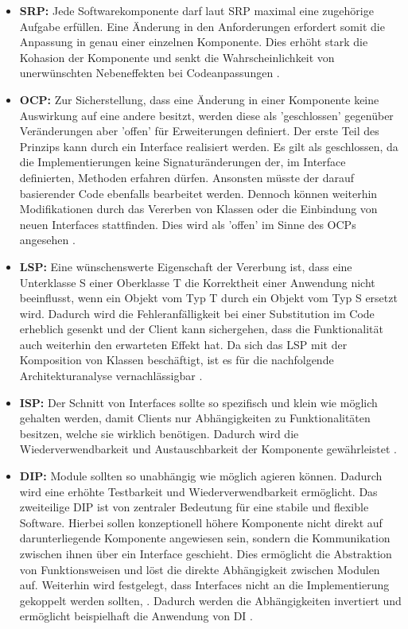 \begin{itemize}[]
	\item \textbf{\acrlong{SRP}: } {Jede Softwarekomponente darf laut SRP maximal eine zugehörige Aufgabe erfüllen. Eine Änderung in den Anforderungen erfordert somit die Anpassung in genau einer einzelnen Komponente. Dies erhöht stark die \Gls{Kohasion} der Komponente und senkt die Wahrscheinlichkeit von unerwünschten Nebeneffekten bei Codeanpassungen \cite{Martin.SRP, Martin.2018}.}
	\item \textbf{\acrlong{OCP}: } {Zur Sicherstellung, dass eine Änderung in einer Komponente keine Auswirkung auf eine andere besitzt, werden diese als 'geschlossen' gegenüber Veränderungen aber 'offen' für Erweiterungen definiert. Der erste Teil des Prinzips kann durch ein Interface realisiert werden. Es gilt als geschlossen, da die Implementierungen keine Signaturänderungen der, im Interface definierten, Methoden erfahren dürfen. Ansonsten müsste der darauf basierender Code ebenfalls bearbeitet werden. Dennoch können weiterhin Modifikationen durch das Vererben von Klassen oder die Einbindung von neuen Interfaces stattfinden. Dies wird als 'offen' im Sinne des OCPs angesehen \cite{Martin.2018, Meyer.2009}.}
	\item \textbf{\acrlong{LSP}: } {Eine wünschenswerte Eigenschaft der Vererbung ist, dass eine Unterklasse S einer Oberklasse T die Korrektheit einer Anwendung nicht beeinflusst, wenn ein Objekt vom Typ T durch ein Objekt vom Typ S ersetzt wird. Dadurch wird die Fehleranfälligkeit bei einer Substitution im Code erheblich gesenkt und der Client kann sichergehen, dass die Funktionalität auch weiterhin den erwarteten Effekt hat. Da sich das LSP mit der Komposition von Klassen beschäftigt, ist es für die nachfolgende Architekturanalyse vernachlässigbar \cite{Martin.2018, Liskov.1994}.}
	\item \textbf{\acrlong{ISP}: } {Der Schnitt von Interfaces sollte so spezifisch und klein wie möglich gehalten werden, damit Clients nur Abhängigkeiten zu Funktionalitäten besitzen, welche sie wirklich benötigen. Dadurch wird die Wiederverwendbarkeit und Austauschbarkeit der Komponente gewährleistet \cite{Martin.2018}\cite[S. 135ff.]{Martin.2003}.}
	\item \textbf{\acrlong{DIP}: } {Module sollten so unabhängig wie möglich agieren können. Dadurch wird eine erhöhte Testbarkeit und Wiederverwendbarkeit ermöglicht. Das zweiteilige DIP ist von zentraler Bedeutung für eine stabile und flexible Software. Hierbei sollen konzeptionell höhere Komponente nicht direkt auf darunterliegende Komponente angewiesen sein, sondern die Kommunikation zwischen ihnen über ein Interface geschieht. Dies ermöglicht die Abstraktion von Funktionsweisen und löst die direkte Abhängigkeit zwischen Modulen auf. Weiterhin wird festgelegt, dass Interfaces nicht an die Implementierung gekoppelt werden sollten,  \cite{Martin.1996, Martin.2018}. Dadurch werden die Abhängigkeiten invertiert und ermöglicht beispielhaft die Anwendung von \Gls{DI} \cite{Fowler.2004}.}
\end{itemize}

